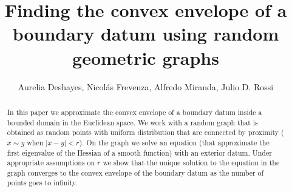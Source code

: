 \documentclass[11pt]{amsart}
\theoremstyle{definition}
\theoremstyle{remark}
\numberwithin{equation}{section}
\begin{document}
	
\title[The convex envelope and random geometric graphs]{Finding the convex envelope of a boundary datum using random geometric graphs}

\author[A. Deshayes, N. Frevenza, A. Miranda, J. D. Rossi]{Aurelia Deshayes, Nicol\'{a}s Frevenza, Alfredo Miranda, Julio D. Rossi}
	
	
	 \address{ 
		 Aurelia Deshayes. Univ Paris Est Creteil, Univ Gustave Eiffel, CNRS, LAMA UMR8050, F-94010 Creteil,
France and IRL CNRS IFUMI-2030, Montevideo, Uruguay.
		 \newline
			\texttt{~aurelia.deshayes@u-pec.fr}; 
		\bigskip
		\newline
		\indent Nicol\'{a}s Frevenza. Departamento de M\'{e}todos Cuantitativos, FCEA,
Universidad de la Rep\'{u}blica
Gonzalo Ram\'{i}rez 1926 (11200), Montevideo, Uruguay.
\newline
			\texttt{~nicolas.frevenza@fcea.edu.uy}; 
		\bigskip
		\newline
		 \indent Alfredo Miranda. Departamento de Matem\'{a}tica, FCEyN, Universidad  de Buenos Aires, Pabell\'{o}n I, Ciudad Universitaria (1428), Buenos Aires, Argentina.   
		 \newline
		 \texttt{~amiranda@dm.uba.ar};	
		 \bigskip
		\newline
		 \indent Julio D. Rossi. Departamento de Matem\'{a}ticas y Estadistica, 
		 Universidad Torcuato Di Tella.  Av. Figueroa Alcorta 7350, Buenos Aires, Argentina.
		 \newline
		 \texttt{~julio.rossi@utdt.edu}		
}
	

	
\medskip

\begin{abstract}
	In this paper we approximate the convex envelope of a boundary datum inside
	 a bounded domain in the Euclidean space. We work with a random graph that is obtained as random points with 
	uniform distribution that are connected by proximity ($x\sim y$ when $|x-y|<r$).  
	On the graph we solve an equation (that approximate the first eigenvalue of the Hessian
	of a smooth function) with an exterior datum. Under appropriate 
	assumptions on $r$ we show that the unique solution to the equation in the graph 
	converges to the convex envelope of the boundary datum as the number of points 
	goes to infinity. 
	\end{abstract}
\end{document}
